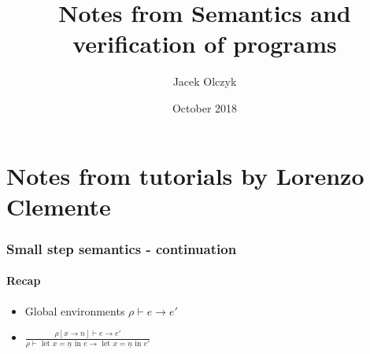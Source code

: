 \documentclass{article}
\title{Notes from Semantics and verification of programs}
\author{Jacek Olczyk}
\date{October 2018}
\begin{document}
\maketitle
\part{Notes from tutorials by Lorenzo Clemente}
\section{Small step semantics - continuation}
\subsection{Recap}
\begin{itemize}
	\item Global environments $ \rho \vdash e \rightarrow e' $
	\item $\frac{\rho[x\rightarrow n]\vdash e \rightarrow e' }{
		 \rho\vdash\text{ let } x= \underline{n}\text{ in }e \rightarrow\text{ let }x = \underline{n}\text{ in }e'}$
\end{itemize}
\end{document}
